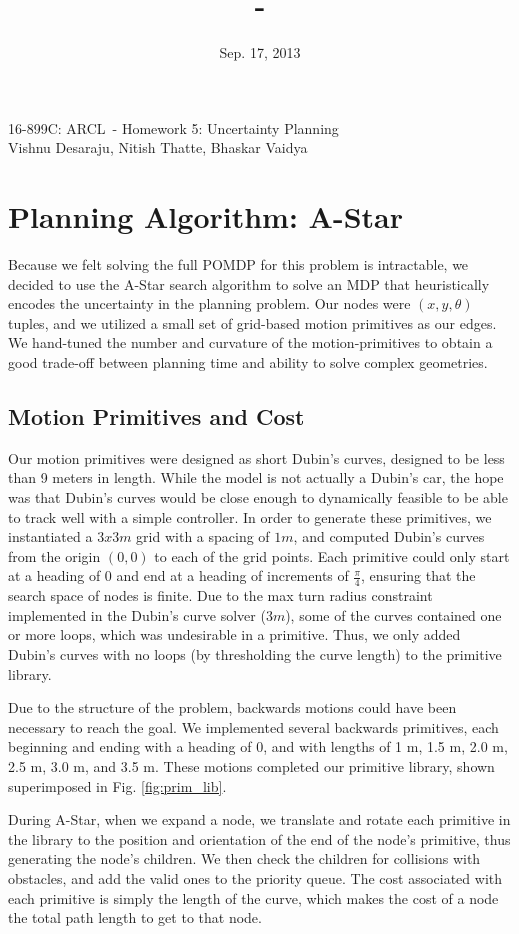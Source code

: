 \documentclass{article}
\title{\hwkTitle\ -\ \hwkClass}
\author{\hwkAuthor}
\date{Sep. 17, 2013}
\newcommand{\hwkTitle}{Homework 5: Uncertainty Planning}
\newcommand{\hwkAuthor}{Vishnu Desaraju, Nitish Thatte, Bhaskar Vaidya}
\newcommand{\hwkClass}{16-899C: ARCL}
\newcommand{\insertTitle}{\begin{center}\LARGE{\hwkClass\ - \hwkTitle} \\ \large{\hwkAuthor} \end{center}}
\begin{document}
\insertTitle
\vspace*{3ex}

\section{Planning Algorithm: A-Star}

Because we felt solving the full POMDP for this problem is intractable, we decided to use the A-Star search algorithm to solve an MDP that heuristically encodes the uncertainty in the planning problem. Our nodes were $(x, y, \theta)$ tuples, and we utilized a small set of grid-based motion primitives as our edges. We hand-tuned the number and curvature of the motion-primitives to obtain a good trade-off between planning time and ability to solve complex geometries.

\subsection{Motion Primitives and Cost}

Our motion primitives were designed as short Dubin's curves, designed to be less than 9 meters in length. While the model is not actually a Dubin's car, the hope was that Dubin's curves would be close enough to dynamically feasible to be able to track well with a simple controller. In order to generate these primitives, we instantiated a $3x3 m$ grid with a spacing of $1 m$, and computed Dubin's curves from the origin $(0,0)$ to each of the grid points. Each primitive could only start at a heading of $0$ and end at a heading of increments of $\frac{\pi}{4}$, ensuring that the search space of nodes is finite. Due to the max turn radius constraint implemented in the Dubin's curve solver ($3 m$), some of the curves contained one or more loops, which was undesirable in a primitive. Thus, we only added Dubin's curves with no loops (by thresholding the curve length) to the primitive library.

Due to the structure of the problem, backwards motions could have been necessary to reach the goal. We implemented several backwards primitives, each beginning and ending with a heading of $0$, and with lengths of 1 m, 1.5 m, 2.0 m, 2.5 m, 3.0 m, and 3.5 m. These motions completed our primitive library, shown superimposed in Fig. \ref{fig:prim_lib}.


During A-Star, when we expand a node, we translate and rotate each primitive in the library to the position and orientation of the end of the node's primitive, thus generating the node's children. We then check the children for collisions with obstacles, and add the valid ones to the priority queue. The cost associated with each primitive is simply the length of the curve, which makes the cost of a node the total path length to get to that node.
\end{document}
